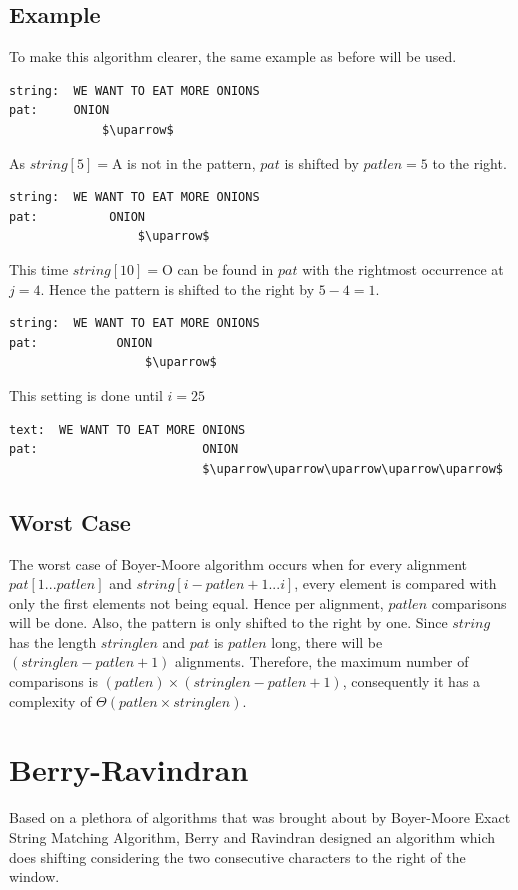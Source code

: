 \subsection{Example}
To make this algorithm clearer, the same example as before will be used.
\begin{lstlisting}
string:  WE WANT TO EAT MORE ONIONS
pat:     ONION
             $\uparrow$
\end{lstlisting}

As $string[5]=$A is not in the pattern, $pat$ is shifted by $patlen=5$ to the right.

\begin{lstlisting}
string:  WE WANT TO EAT MORE ONIONS
pat:          ONION
                  $\uparrow$
\end{lstlisting}

This time $string[10]=$O can be found in $pat$ with the rightmost occurrence at $j=4$. Hence the pattern is shifted to the right by $5-4=1$.

\begin{lstlisting}
string:  WE WANT TO EAT MORE ONIONS
pat:           ONION
                   $\uparrow$
\end{lstlisting}

This setting is done until $i=25$

\begin{lstlisting}
text:  WE WANT TO EAT MORE ONIONS
pat:                       ONION
                           $\uparrow\uparrow\uparrow\uparrow\uparrow$
\end{lstlisting}

\subsection{Worst Case}
The worst case of Boyer-Moore algorithm occurs when for every alignment $pat[1...patlen]$ and $string[i-patlen+1...i]$, every element is compared with only the first elements not being equal. Hence per alignment, $patlen$ comparisons will be done. Also, the pattern is only shifted to the right by one. Since $string$ has the length $stringlen$ and $pat$ is $patlen$ long, there will be $(stringlen-patlen+1)$ alignments. Therefore, the maximum number of comparisons is $(patlen)\times(stringlen-patlen+1)$, consequently it has a complexity of $\Theta(patlen \times stringlen)$.\cite{boyerMoore}


\section{Berry-Ravindran}			%
Based on a plethora of algorithms that was brought about by Boyer-Moore Exact String Matching Algorithm, Berry and Ravindran designed an algorithm which does shifting considering the two consecutive characters to the right of the window.
